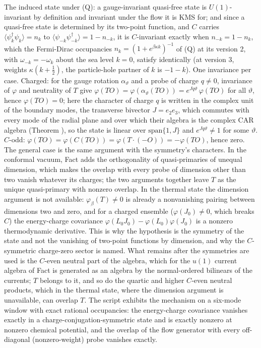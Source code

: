 The induced state under (Q): a gauge-invariant quasi-free state is $U(1)$-invariant by definition and invariant under the flow it is KMS for; and since a quasi-free state is determined by its two-point function, and $C$ carries $\langle\psi^\dagger_k\psi_k\rangle = n_k$ to $\langle\psi_{-k}\psi^\dagger_{-k}\rangle = 1 - n_{-k}$, it is $C$-invariant exactly when $n_{-k} = 1 - n_k$, which the Fermi-Dirac occupancies $n_k = (1 + e^{\beta\kappa k})^{-1}$ of (Q) at its version 2, with $\omega_{-k} = -\omega_k$ about the sea level $k = 0$, satisfy identically (at version 3, weights $\kappa(k + \tfrac12)$, the particle-hole partner of $k$ is $-1-k$). One invariance per case. Charged: for the gauge rotation $\alpha_\vartheta$ and a probe of charge $q \neq 0$, invariance of $\varphi$ and neutrality of $T$ give $\varphi(T O) = \varphi(\alpha_\vartheta(T O)) = e^{Jq\vartheta}\,\varphi(T O)$ for all $\vartheta$, hence $\varphi(TO) = 0$; here the character of charge $q$ is written in the complex unit of the boundary modes, the transverse bivector $J = e_{2}e_{3}$, which commutes with every mode of the radial plane and over which their algebra is the complex CAR algebra (Theorem ), so the state is linear over $\mathrm{span}\{1, J\}$ and $e^{Jq\vartheta} \neq 1$ for some $\vartheta$. $C$-odd: $\varphi(T O) = \varphi(C(T O)) = \varphi(T\cdot(-O)) = -\varphi(TO)$, hence zero. The general case is the same argument with the symmetry's characters. In the conformal vacuum, Fact  adds the orthogonality of quasi-primaries of unequal dimension, which makes the overlap with every probe of dimension other than two vanish whatever its charges; the two arguments together leave $T$ as the unique quasi-primary with nonzero overlap. In the thermal state the dimension argument is not available: $\varphi_\beta(T) \neq 0$ is already a nonvanishing pairing between dimensions two and zero, and for a charged ensemble ($\varphi(J_0) \neq 0$, which breaks $C$) the energy-charge covariance $\varphi(L_0 J_0) - \varphi(L_0)\varphi(J_0)$ is a nonzero thermodynamic derivative. This is why the hypothesis is the symmetry of the state and not the vanishing of two-point functions by dimension, and why the $C$-symmetric charge-zero sector is named. What remains after the symmetries are used is the $C$-even neutral part of the algebra, which for the $u(1)$ current algebra of Fact  is generated as an algebra by the normal-ordered bilinears of the currents; $T$ belongs to it, and so do the quartic and higher $C$-even neutral products, which in the thermal state, where the dimension argument is unavailable, can overlap $T$. The script exhibits the mechanism on a six-mode window with exact rational occupancies: the energy-charge covariance vanishes exactly in a charge-conjugation-symmetric state and is exactly nonzero at nonzero chemical potential, and the overlap of the flow generator with every off-diagonal (nonzero-weight) probe vanishes exactly.
